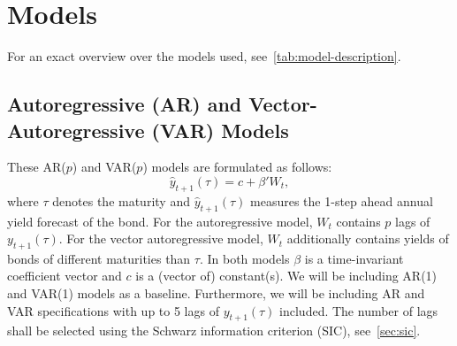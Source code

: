 \section{Models}
\label{sec:models}
For an exact overview over the models used, see~\cref{tab:model-description}.
\subsection{Autoregressive (AR) and Vector-Autoregressive (VAR) Models}
\label{sec:arvar}
These AR($p$) and VAR($p$) models are formulated as follows:
\begin{equation}
	\hat{y}_{t+1}(\tau) = c + \beta' W_t,
\end{equation}
where $\tau$ denotes the maturity and $\hat{y}_{t+1}(\tau)$ measures the 1-step ahead annual yield forecast of the bond. 
For the autoregressive model, $W_t$ contains $p$ lags of $y_{t+1}(\tau)$. For the vector autoregressive model, $W_t$ additionally contains yields of bonds of different maturities than $\tau$. 
In both models $\beta$ is a time-invariant coefficient vector and $c$ is a (vector of) constant(s). 
We will be including AR(1) and VAR(1) models as a baseline. 
Furthermore, we will be including AR and VAR specifications with up to 5 lags of $y_{t+1}(\tau)$ included. 
The number of lags shall be selected using the Schwarz information criterion (SIC), see~\cref{sec:sic}.

